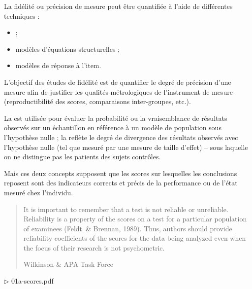 
La fidélité ou précision de mesure peut être quantifiée à l'aide de différentes
techniques :
\begin{itemize}
\item {} ;
\item modèles d'équations structurelles ;
\item modèles de réponse à l'item.
\end{itemize}
\medskip

L'objectif des études de fidélité est de quantifier le degré de précision d'une
mesure afin de justifier les qualités métrologiques de l'instrument de mesure
(reproductibilité des scores, comparaisons inter-groupes, etc.). 



La  est utilisée pour évaluer la
probabilité ou la vraisemblance de résultats observés sur un échantillon en
référence à un modèle de population sous l'hypothèse nulle ; la
 reflète le degré de divergence
des résultats observés avec l'hypothèse nulle (tel que mesuré par une mesure de
taille d'effet) -- sous laquelle on ne distingue pas les patients des sujets
contrôles\autocite{Thompson2003}.

Mais ces deux concepts supposent que les scores sur lesquelles les conclusions
reposent sont des indicateurs corrects et précis de la performance ou de l'état
mesuré chez l'individu.

\foilhead{}

\begin{quote}
It is important to remember that a test is not reliable or
unreliable. Reliability is a property of the scores on a test for a
particular population of examinees (Feldt~\& Brennan, 1989). Thus,
authors should provide reliability coefficients of the scores for the
data being analyzed even when the focus of their research is not
psychometric.

\raggedleft Wilkinson \& APA Task Force\autocite{Wilkinson1999}
\end{quote}


\hfill $\triangleright$ 01a-scores.pdf

